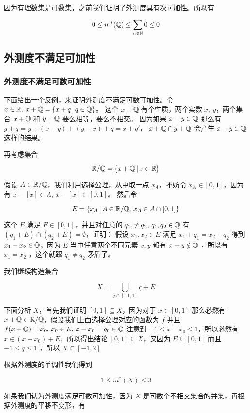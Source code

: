 因为有理数集是可数集，之前我们证明了外测度具有次可加性。所以有

\[
0 \le m^*(\mathbb{Q}) \le \sum_{n \in \mathbb{N}} 0 \le 0
\]

\subsection{外测度不满足可加性}

\subsubsection{外测度不满足可数可加性}

下面给出一个反例，来证明外测度不满足可数可加性。令 $x \in \mathbb{R}, \: x + \mathbb{Q} = \{ x + q \,\vert\, q \in \mathbb{Q} \}$。
这个 $x + \mathbb{Q}$ 有个性质，两个实数 $x,\,y$，两个集合 $x + \mathbb{Q}$ 和 $y + \mathbb{Q}$ 要么相等，要么不相交。
因为如果 $x - y \in \mathbb{Q}$ 那么有 $ y + q = y + (x-y) + (y-x) + q = x + q'$， $x + \mathbb{Q} \cap y + \mathbb{Q}$ 会产生 $x -y \in \mathbb{Q}$ 这样的结果。

再考虑集合 

\[
\mathbb{R} / \mathbb{Q} = \{ x + \mathbb{Q} \,\vert\, x \in \mathbb{R} \}
\]

假设 $A \in \mathbb{R}/\mathbb{Q}$，我们利用选择公理，从中取一点 $x_A$，不妨令 $x_A \in [0,1]$，因为有 $x - [x] \in A, \, x - [x] \in [0,1]$。
然后令

\[
 E = \{ x_A \,\vert\, A \in \mathbb{R}/\mathbb{Q}, \, x_A \in A \cap [0,1] \}
\]

这个 $E$ 满足 $E \in [0,1]$，并且对任意的 $q_1, \ne q_2, \, q_1, q_2 \in \mathbb{Q}$ 有 $(q_1 + E) \cap (q_2 + E) = \emptyset$，证明：
假设 $x_1, x_2 \in E$ 满足 $x_1 + q_1 = x_2 + q_2$ 得到 $x_1 - x_2 \in \mathbb{Q}$，因为 $E$ 当中任意两个不同元素 $x,y$ 都有 $x-y \notin \mathbb{Q}$ ，所以有 $x_1 = x_2$ ，这个就跟 $q_1 \ne q_2$ 矛盾了。

我们继续构造集合

\[
X = \bigcup_{q \in [-1,1]} q + E
\]

下面分析 $X$，首先我们证明 $[0,1] \subseteq X$，因为对于 $x \in [0,1]$ 那么必然有 $x + \mathbb{Q} \in \mathbb{R}/\mathbb{Q}$，假设我们上面选择公理对应的函数为 $f$ 并且 $f(x + \mathbb{Q}) = x_0, \, x_0 \in E,\, x - x_0  = q_0 \in \mathbb{Q}$ 
注意到 $-1 \le x - x_0 \le 1$，所以必然有 $x \in (x - x_0) + E$，所以得出结论 $[0,1] \subseteq X$，又因为 $E \subseteq [0,1]$ 而且 $-1 \le q \le 1$ ，所以 $X \subseteq [-1, 2]$

根据外测度的单调性我们得到

\[
1 \le m^*(X) \le 3
\]

如果我们认为外测度满足可数可加性，因为 $X$ 是可数个不相交集合的并集，再根据外测度的平移不变形，有


